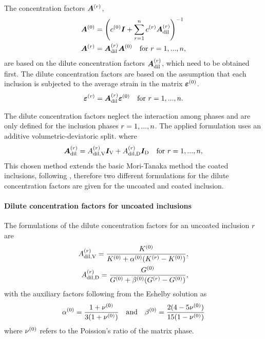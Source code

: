 The concentration factors $\boldsymbol{A}^{(r)}$,
\begin{align}
	\boldsymbol{A}^{(0)} &= \left( c^{(0)}\boldsymbol{I} + \sum^{n}_{r=1} c^{(r)} \boldsymbol{A}_{\text{dil}}^{(r)}\right)^{-1}\label{eq:A0}\\
	\boldsymbol{A}^{(r)} &= \boldsymbol{A}_{\text{dil}}^{(r)}\boldsymbol{A}^{(0)}\quad  \text{for}~ r = 1, ..., n,
\end{align}
are based on the dilute concentration factors $\boldsymbol{A}_{\text{dil}}^{(r)}$, which need to be obtained first.
The dilute concentration factors are based on the assumption that each inclusion is subjected to the average strain in the matrix $\boldsymbol{\varepsilon}^{(0)}$.
\begin{align}
	\boldsymbol{\varepsilon}^{(r)} = \boldsymbol{A}_{\text{dil}}^{(r)}\boldsymbol{\varepsilon}^{(0)} \quad  \text{for}~ r = 1, ..., n. 
\end{align}


The dilute concentration factors neglect the interaction among phases and are only defined for the inclusion phases $r = 1,...,n$.
The applied formulation uses an additive volumetric-deviatoric split. where
\begin{align}
	\boldsymbol{A}_{\text{dil}}^{(r)} = A^{(r)}_{\text{dil,V}}\boldsymbol{I}_{\text{V}} +  A^{(r)}_{\text{dil,D}} \boldsymbol{I}_{\text{D}} \quad  \text{for}~ r = 1, ..., n,
\end{align}
This chosen method extends the basic Mori-Tanaka method the coated inclusions, following \cite{her_1993_nlib}, therefore two different formulations for the dilute concentration factors are given for the uncoated and coated inclusion. 

\paragraph{Dilute concentration factors for uncoated inclusions}
The formulations of the dilute concentration factors for an uncoated inclusion $r$ are
\begin{align}
	A^{(r)}_{\text{dil,V}} = \dfrac{K^{(0)}}{K^{(0)} + \alpha^{(0)}(K^{(r)} - K^{(0)})}, \\
	A^{(r)}_{\text{dil,D}} = \dfrac{G^{(0)}}{G^{(0)} + \beta^{(0)}(G^{(r)} - G^{(0)})}, 
\end{align}
with the auxiliary factors following from the Eshelby solution as
\begin{align}
	\alpha^{(0)} = \frac{1 + \nu^{(0)}}{3(1+ \nu^{(0)})} \quad\text{and}\quad 
	\beta^{(0)} = \frac{2(4 - 5\nu^{(0)})}{15(1 - \nu^{(0)})}
\end{align}
where  $\nu^{(0)}$ refers to the Poission's ratio of the matrix phase.
